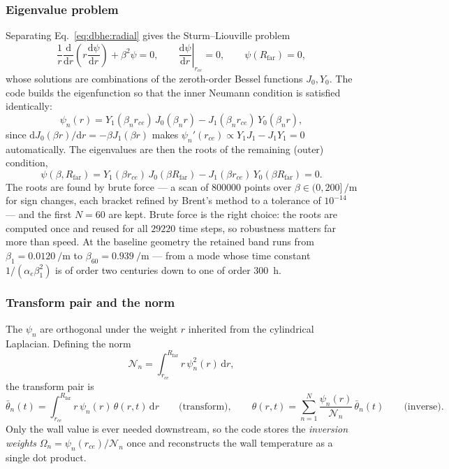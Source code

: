 \documentclass[11pt]{article}
\begin{document}
\subsubsection{Eigenvalue problem}
Separating Eq.~\eqref{eq:dbhe:radial} gives the Sturm--Liouville problem
\begin{equation}
\frac{1}{r}\frac{\mathrm{d}}{\mathrm{d}r}\!\left(r\frac{\mathrm{d}\psi}{\mathrm{d}r}\right)
+\beta^{2}\psi=0, \qquad \left.\frac{\mathrm{d}\psi}{\mathrm{d}r}\right|_{r_{ce}}=0, \qquad
\psi(R_{\mathrm{far}})=0 ,
\label{eq:dbhe:SL}
\end{equation}
whose solutions are combinations of the zeroth-order Bessel functions $J_0,Y_0$.
The code builds the eigenfunction so that the inner Neumann condition is
satisfied identically:
\begin{equation}
\psi_n(r)=Y_1(\beta_n r_{ce})\,J_0(\beta_n r)-J_1(\beta_n r_{ce})\,Y_0(\beta_n r),
\label{eq:dbhe:psi}
\end{equation}
since $\mathrm{d}J_0(\beta r)/\mathrm{d}r=-\beta J_1(\beta r)$ makes
$\psi_n'(r_{ce})\propto Y_1 J_1-J_1 Y_1=0$ automatically. The eigenvalues are
then the roots of the remaining (outer) condition,
\begin{equation}
\psi(\beta,R_{\mathrm{far}}) =Y_1(\beta r_{ce})\,J_0(\beta R_{\mathrm{far}}) -J_1(\beta
r_{ce})\,Y_0(\beta R_{\mathrm{far}})=0 .
\label{eq:dbhe:chareq}
\end{equation}
The roots are found by brute force --- a scan of $\num{800000}$ points over
$\beta\in(0,200]\,\si{\per\metre}$ for sign changes, each bracket refined by
Brent's method to a tolerance of $10^{-14}$ --- and the first $N=60$ are kept.
Brute force is the right choice: the roots are computed once and reused for all
$\num{29220}$ time steps, so robustness matters far more than speed. At the
baseline geometry the retained band runs from
$\beta_1=\SI{0.0120}{\per\metre}$ to $\beta_{60}=\SI{0.939}{\per\metre}$ --- from
a mode whose time constant $1/(\alpha_e\beta_1^2)$ is of order two centuries
down to one of order \SI{300}{\hour}.

\subsubsection{Transform pair and the norm}
The $\psi_n$ are orthogonal under the weight $r$ inherited from the cylindrical
Laplacian. Defining the norm
\begin{equation}
\mathcal{N}_n=\int_{r_{ce}}^{R_{\mathrm{far}}} r\,\psi_n^2(r)\,\mathrm{d}r ,
\label{eq:dbhe:norm}
\end{equation}
the transform pair is
\begin{equation}
\bar\theta_n(t)=\int_{r_{ce}}^{R_{\mathrm{far}}} r\,\psi_n(r)\,\theta(r,t)\,\mathrm{d}r
\qquad\text{(transform)}, \qquad
\theta(r,t)=\sum_{n=1}^{N}\frac{\psi_n(r)}{\mathcal{N}_n}\,\bar\theta_n(t)
\qquad\text{(inverse)} .
\label{eq:dbhe:pair}
\end{equation}
Only the wall value is ever needed downstream, so the code stores the
\emph{inversion weights} $\Omega_n=\psi_n(r_{ce})/\mathcal{N}_n$ once and
reconstructs the wall temperature as a single dot product.
\end{document}
